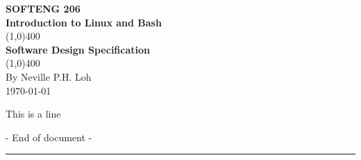 \documentclass[11pt]{book}
\begin{document}
\begin{titlepage}
\begin{center}
\vspace*{2cm}
\Large{\textbf {SOFTENG 206}}\\
\Large{\textbf {Introduction to Linux and Bash}}\\[1cm]
\line(1,0){400}\\[5mm]
\Large{\textbf{Software Design Specification}}\\[1mm]
\line(1,0){400}\\[1cm]
By Neville P.H. Loh \\
\today\\
\vfill

\end{center}
\end{titlepage}
\tableofcontents
\break

This is a line
\setcounter{page}{1}


\vfill
\begin{center}
- End of document -
\rule{17cm}{0.4pt}
\end{center}
\end{document}
